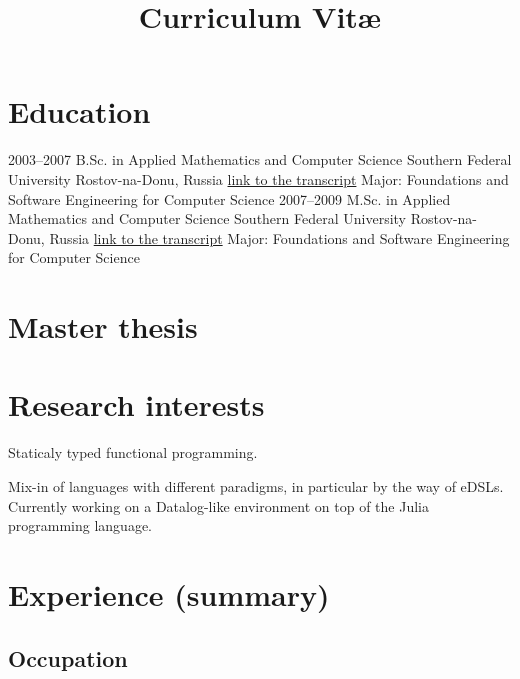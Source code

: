 \documentclass[11pt,a4paper]{moderncv}   %
\title{Curriculum Vitæ}               %
\newcommand{\myhref}[2]{\textcolor{blue}{\href{#1}{#2}}}
\begin{document}
\maketitle

\section{Education}
\cventry%
    {2003--2007}%
    {B.Sc. in Applied Mathematics and Computer Science}%
    {Southern Federal University}%
    {Rostov-na-Donu, Russia}%
    {\myhref%
        {http://mmcs.sfedu.ru/~ulysses/Edu/Diploma/scans/diploma-euro-supplement.pdf}%
        {link to the transcript}}  %
    {Major: Foundations and Software Engineering for Computer Science}
\cventry%
    {2007--2009}%
    {M.Sc. in Applied Mathematics and Computer Science}%
    {Southern Federal University}%
    {Rostov-na-Donu, Russia}%
    {\myhref{http://mmcs.sfedu.ru/~ulysses/Edu/Diploma/scans/diploma-euro-supplement.pdf}{link to the transcript}}%
    {Major: Foundations and Software Engineering for Computer Science}

\section{Master thesis}

\section{Research interests}

Staticaly typed functional programming.

Mix-in of languages with different paradigms, in particular by the way of eDSLs. Currently working on a Datalog-like environment on top of the Julia programming language.

\section{Experience (summary)}

\subsection{Occupation}
\end{document}
